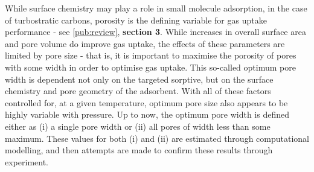 While surface chemistry may play a role in small molecule \gls{adsorption},\citep{Lueking2004, Li2011a, Li2020Sustainable, wang2012significantly, Botome2017Preparation, liang2013, Kayal2018Activated} in the case of \glspl{turbostratic carbon}, porosity is the defining variable for gas uptake performance\citep{Sevilla2014Energy, Adeniran2016Is, Sevilla2013Assessment, Choi2019Unique, Lee2013Determination, Presser2011Effect, Wickramaratne2013Importance} - see \ref{pub:review}, \textbf{section 3}. While increases in overall surface area and pore volume do improve gas uptake,\citep{Cox2017Ultra, Blankenship2017Cigarette} the effects of these parameters are limited by pore size\citep{Sevilla2014Energy, Sevilla2013Assessment} \citep{Choi2019Unique, Li2019Selective, Cabria2007optimum, Gogotsi2009, Masika2012} - that is, it is important to maximise the porosity of pores with some width in order to optimise gas uptake. This so-called optimum pore width is dependent not only on the targeted sorptive,\citep{Presser2011Effect, Biloe2002Optimal, Cabria2007optimum} but on the surface chemistry\citep{wang2012significantly, Kayal2018Activated, Lueking2004} and pore geometry\citep{Rzepka1998Physisorption, Zhou2004comparative, Hlushak2018Heat} of the \gls{adsorbent}. With all of these factors controlled for, at a given temperature, optimum pore size also appears to be highly variable with pressure.\citep{Presser2011Effect, DelaCasaLillo2002Hydrogen} Up to now, the optimum pore width is defined either as (i) a single pore width\citep{Sevilla2014Energy, Choi2019Unique, Li2019Selective} or (ii) all pores of width less than some maximum.\citep{Biloe2002Optimal, Cabria2007optimum, Presser2011Effect} These values for both (i) and (ii) are estimated through computational modelling,\citep{Biloe2002Optimal, Cabria2007optimum, Hlushak2018Heat} and then attempts are made to confirm these results through experiment.\citep{Choi2019Unique, Presser2011Effect}

